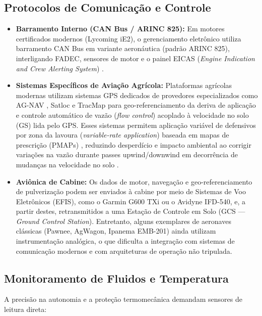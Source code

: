 \documentclass[a4paper,12pt]{article}
\begin{document}
\subsection{Protocolos de Comunicação e Controle}
\begin{itemize}
    \item \textbf{Barramento Interno (CAN Bus / ARINC 825):} Em motores certificados modernos (Lycoming iE2), o gerenciamento eletrônico utiliza barramento CAN Bus em variante aeronáutica (padrão ARINC 825), interligando FADEC, sensores de motor e o painel EICAS (\textit{Engine Indication and Crew Alerting System}) \cite{lycomingmanual, lycoming_io720}.
    
    \item \textbf{Sistemas Específicos de Aviação Agrícola:} Plataformas agrícolas modernas utilizam sistemas GPS dedicados de provedores especializados como AG-NAV \cite{agnav_official}, Satloc \cite{satloc_intelliflow} e TracMap \cite{tracmap_aviation} para geo-referenciamento da deriva de aplicação e controle automático de vazão (\textit{flow control}) acoplado à velocidade no solo (GS) lida pelo GPS. Esses sistemas permitem aplicação variável de defensivos por zona da lavoura (\textit{variable-rate application}) baseada em mapas de prescrição (PMAPs) \cite{satloc_intelliflow, kirk_1996_satloc}, reduzindo desperdício e impacto ambiental ao corrigir variações na vazão durante passes upwind/downwind em decorrência de mudanças na velocidade no solo \cite{kirk_1996_satloc}.
    
    \item \textbf{Aviônica de Cabine:} Os dados de motor, navegação e geo-referenciamento de pulverização podem ser enviados à cabine por meio de Sistemas de Voo Eletrônicos (EFIS), como o Garmin G600 TXi ou o Avidyne IFD-540, e, a partir destes, retransmitidos a uma Estação de Controle em Solo (GCS --- \textit{Ground Control Station}). Entretanto, alguns exemplares de aeronaves clássicas (Pawnee, AgWagon, Ipanema EMB-201) ainda utilizam instrumentação analógica, o que dificulta a integração com sistemas de comunicação modernos e com arquiteturas de operação não tripulada. %
\end{itemize}

\subsection{Monitoramento de Fluidos e Temperatura}
A precisão na autonomia e a proteção termomecânica demandam sensores de leitura direta:
\end{document}

